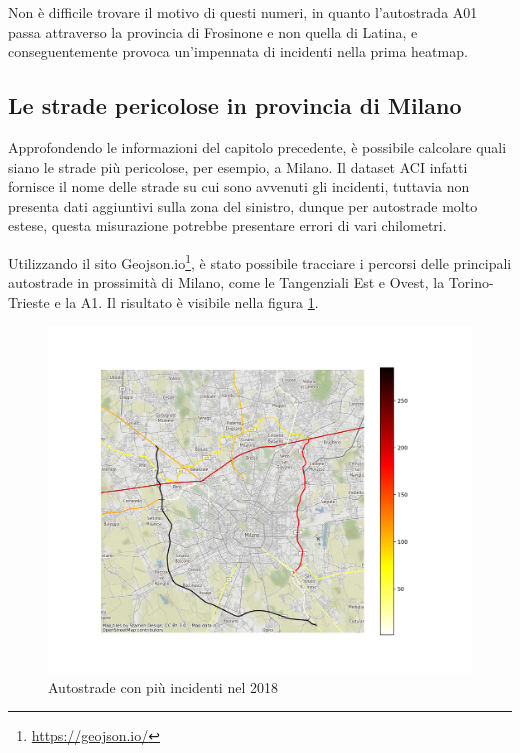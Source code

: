 \documentclass[a4paper,12pt]{report}
\begin{document}
Non è difficile trovare il motivo di questi numeri, in quanto l'autostrada A01 passa 
attraverso la provincia di Frosinone e non quella di Latina, e conseguentemente provoca 
un'impennata di incidenti nella prima heatmap. 

\subsection{Le strade pericolose in provincia di Milano}

Approfondendo le informazioni del capitolo precedente, è possibile calcolare quali siano 
le strade più pericolose, per esempio, a Milano. 
Il dataset ACI infatti fornisce il nome delle strade su cui sono avvenuti gli incidenti, 
tuttavia non presenta dati aggiuntivi sulla zona del sinistro, dunque per autostrade molto 
estese, questa misurazione potrebbe presentare errori di vari chilometri. 

Utilizzando il sito Geojson.io\footnote{\url{https://geojson.io/}}, 
è stato possibile tracciare i percorsi delle principali autostrade in prossimità di 
Milano, come le Tangenziali Est e Ovest, la Torino-Trieste e la A1. 
Il risultato è visibile nella figura \ref{fig:line-incidenti-milano}.

\begin{figure}
    \includegraphics[width=\linewidth]{../src/incidenti/incidenti_aci/autostrade/incidenti_line_chart.png}
    \caption{Autostrade con più incidenti nel 2018}
    \label{fig:line-incidenti-milano}
\end{figure}
\end{document}
